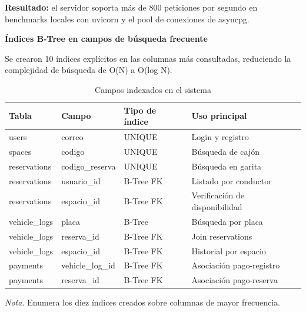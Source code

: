 \textbf{Resultado:} el servidor soporta más de 800 peticiones por segundo en benchmarks locales con uvicorn y el pool de conexiones de asyncpg.

\textbf{Índices B-Tree en campos de búsqueda frecuente}

Se crearon 10 índices explícitos en las columnas más consultadas, reduciendo la complejidad de búsqueda de O(N) a O(log N).




\begin{table}[htbp]
\caption{Campos indexados en el sistema}
\label{tab:indices_bd_v2}
\begin{tabular}{@{}p{3cm} p{3.5cm} p{3.5cm} p{5cm}@{}}
\toprule
\textbf{Tabla} & \textbf{Campo} & \textbf{Tipo de índice} & \textbf{Uso principal} \\
\midrule
users & correo & UNIQUE & Login y registro \\
spaces & codigo & UNIQUE & Búsqueda de cajón \\
reservations & codigo\_reserva & UNIQUE & Búsqueda en garita \\
reservations & usuario\_id & B-Tree FK & Listado por conductor \\
reservations & espacio\_id & B-Tree FK & Verificación de disponibilidad \\
vehicle\_logs & placa & B-Tree & Búsqueda por placa \\
vehicle\_logs & reserva\_id & B-Tree FK & Join reservations \\
vehicle\_logs & espacio\_id & B-Tree FK & Historial por espacio \\
payments & vehicle\_log\_id & B-Tree FK & Asociación pago-registro \\
payments & reserva\_id & B-Tree FK & Asociación pago-reserva \\
\bottomrule
\end{tabular}
\par\vspace{0.2cm}
\textit{Nota.} Enumera los diez índices creados sobre columnas de mayor frecuencia.
\end{table}

